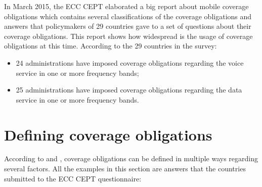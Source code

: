 In March 2015, the ECC CEPT elaborated a big report about mobile coverage obligations \cite{2-08} which contains several classifications of the coverage obligations and answers that policymakers of 29 countries gave to a set of questions about their coverage obligations.  This report shows how widespread is the usage of coverage obligations at this time. According to the 29 countries in the survey:\par

\begin{itemize}
	\item 24 administrations have imposed coverage obligations regarding the voice service in one or more frequency bands;\par

	\item 25 administrations have imposed coverage obligations regarding the data service in one or more frequency bands.
\end{itemize}\par











\section{Defining coverage obligations}
According to \cite{2-08} and \cite{2-03}, coverage obligations can be defined in multiple ways regarding several factors. All the examples in this section are answers that the countries submitted to the ECC CEPT questionnaire:\par

